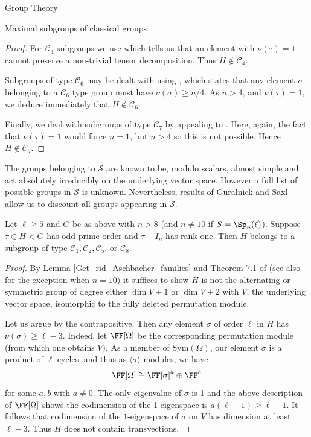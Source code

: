\documentclass[11pt,a4paper]{article}
\newcommand{\C}{\mathcal{C}}
\begin{document}
\begin{section}{Group Theory}
\begin{subsection}{Maximal subgroups of classical groups}
\begin{proof}
For $\C_4$ subgroups we use \cite[Lemma 3.7]{Liebeck_Shalev} which tells us that an element with $\nu(\tau)=1$ cannot preserve a non-trivial tensor decomposition. Thus $H \not \in \C_4$.

Subgroups of type $\C_6$ may be dealt with using \cite[Lemma 6.3]{Burness_II}, which states that any element $\sigma$ belonging to a $\C_6$ type group must have $\nu(\sigma) \geq n/4$. As $n>4$, and $\nu(\tau) = 1$, we deduce immediately that $H \not \in \C_6$.

Finally, we deal with subgroups of type $\C_7$ by appealing to \cite[Lemma 7.1]{Burness_II}. Here, again, the fact that $\nu(\tau)=1$ would force $n=1$, but $n>4$ so this is not possible. Hence $H \not \in \C_7$.
\end{proof}

The groups belonging to $\mathcal{S}$ are known to be, modulo scalars, almost simple and act absolutely irreducibly on the underlying vector space. However a full list of possible groups in $\mathcal{S}$ is unknown. Nevertheless, results of Guralnick and Saxl \cite{Guralnick_Saxl} allow us to discount all groups appearing in $\mathcal{S}$.


\begin{lemma}
Let $\ell \geq 5$ and $G$ be as above with $n > 8$ (and $n \neq 10$ if $S= \Sp_n(\ell)$). Suppose $\tau \in H < G$ has odd prime order and $\tau - I_n$ has rank one. Then $H$ belongs to a subgroup of type $\C_1, \C_2, \C_5$, or $\C_8$.
\end{lemma}

\begin{proof}
By Lemma \ref{Get_rid_Aschbacher_families} and Theorem 7.1 of \cite{Guralnick_Saxl} (see also \cite[Table 2.3]{Burness_IV} for the exception when $n=10$) it suffices to show $H$ is not the alternating or symmetric group of degree either $\dim V + 1$ or $\dim V +2$ with $V$, the underlying vector space, isomorphic to the fully deleted permutation module.

Let us argue by the contrapositive.
Then any element $\sigma$ of order $\ell$ in $H$ has $\nu(\sigma) \geq \ell-3$.
Indeed, let $\FF[\Omega]$ be the corresponding permutation module (from which one obtains $V$).
As a member of $\mathrm{Sym}(\Omega)$, our element $\sigma$ is a product of $\ell$-cycles, and thus as $\langle\sigma\rangle$-modules, we have
$$\FF[\Omega] \cong \FF[\sigma]^a \oplus \FF^b $$
for some $a,b$ with $a\neq 0$.
The only eigenvalue of $\sigma$ is 1 and the above description of $\FF[\Omega]$ shows the codimension of the 1-eigenspace is $ a(\ell-1) \geq \ell-1$.
It follows that codimension of the $1$-eigenspace of $\sigma$ on $V$ has dimension at least $\ell-3$.
Thus $H$ does not contain transvections.


\end{proof}
\end{subsection}
\end{section}
\end{document}

